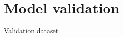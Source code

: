 \documentclass[10pt]{beamer}
\newcommand\Wider[2][3em]{%
\makebox[\linewidth][c]{%
  \begin{minipage}{\dimexpr\textwidth+#1\relax}
  \raggedright#2
  \end{minipage}%
  }%
}
\begin{document}
\section{Model validation}

\begin{frame}{Validation dataset}

\end{frame}

%
%
%
\end{document}
